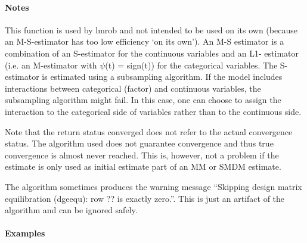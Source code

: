 \documentclass[letterpaper,10pt,english]{sphinxmanual}
\begin{document}
\begin{fulllineitems}
\begin{quote}
\begin{description}
\end{description}\end{quote}




{\hyperref[\detokenize{_modules/lmrob:module-lmrob}]{}}


\paragraph{Notes}

This function is used by lmrob and not intended to be used on its own (because an M-S-estimator
has too low efficiency ‘on its own’).
An M-S estimator is a combination of an S-estimator for the continuous variables and an L1-
estimator (i.e. an M-estimator with \(\psi\)(t) = sign(t)) for the categorical variables.
The S-estimator is estimated using a subsampling algorithm. If the model includes interactions
between categorical (factor) and continuous variables, the subsampling algorithm might fail. In
this case, one can choose to assign the interaction to the categorical side of variables rather than
to the continuous side.

Note that the return status converged does not refer to the actual convergence status. The algorithm
used does not guarantee convergence and thus true convergence is almost never reached. This is,
however, not a problem if the estimate is only used as initial estimate part of an MM or SMDM
estimate.

The algorithm sometimes produces the warning message “Skipping design matrix equilibration
(dgeequ): row ?? is exactly zero.”. This is just an artifact of the algorithm and can be ignored
safely.
\paragraph{Examples}


\end{fulllineitems}
\end{document}
